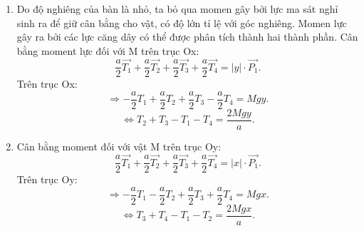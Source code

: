 \begin{enumerate}[label=(\alph*)]
\begin{enumerate}[label=(\roman*)]
\begin{enumerate} [label=(\arabic*)]
\begin{equation}
        \Delta z_3 = z_0 -\dfrac{a}{2} \theta y 
 +\dfrac{a}{2} \theta x.
    \end{equation}
    Tại vị trí $\left(-\dfrac{a}{2};-\dfrac{a}{2}\right)$:
    \begin{equation}
        \Delta z_4 = z_0 -\dfrac{a}{2} \theta y -\dfrac{a}{2} \theta x.
    \end{equation}
    Áp dụng định luật Hooke cho các dây treo dãn đã cho, lực căng dây i có độ lớn:
    \begin{equation}
        T_i = k \cdot \Delta z_i \left( i \in N^* |1 \le i \le 4 \right).
    \end{equation}
    với độ dãn của dây là $\Delta z_i$.
    \item Do độ nghiêng của bàn là nhỏ, ta bỏ qua momen gây bởi lực ma sát nghỉ sinh ra để giữ cân bằng cho vật, có độ lớn tỉ lệ với góc nghiêng. \newline Momen lực gây ra bởi các lực căng dây có thể được phân tích thành hai thành phần.
    \newline
    Cân bằng moment lực đối với M trên trục Ox:
    \begin{equation}
        \dfrac{a}{2}\vec{T_1}+\dfrac{a}{2}\vec{T_2}+\dfrac{a}{2}\vec{T_3}+\dfrac{a}{2}\vec{T_4} =  |y|\cdot \vec{P_1}.
    \end{equation}
    Trên trục Ox:
    \begin{equation}
    \Longrightarrow    
    -\dfrac{a}{2}T_1+\dfrac{a}{2}T_2+\dfrac{a}{2}T_3-\dfrac{a}{2}T_4 = Mgy.
    \end{equation}
    \begin{equation}
    \Longleftrightarrow   
    T_2 +T_3 - T_1-T_4 = \dfrac{2Mgy}{a}.
    \end{equation}
    \item
    Cân bằng moment đối với vật M trên trục Oy:
    \begin{equation}
        \dfrac{a}{2}\vec{T_1}+\dfrac{a}{2}\vec{T_2}+\dfrac{a}{2}\vec{T_3}+\dfrac{a}{2}\vec{T_4} =  |x|\cdot \vec{P_1}.
    \end{equation}
    Trên trục Oy:
    \begin{equation}
    \Longrightarrow    
    -\dfrac{a}{2}T_1-\dfrac{a}{2}T_2+\dfrac{a}{2}T_3+\dfrac{a}{2}T_4 = Mgx.
    \end{equation}
    \begin{equation}
    \Longleftrightarrow   
    T_3 +T_4- T_1-T_2 = \dfrac{2Mgx}{a}.
    \end{equation}
    \end{enumerate}

\end{enumerate}
\end{enumerate}
